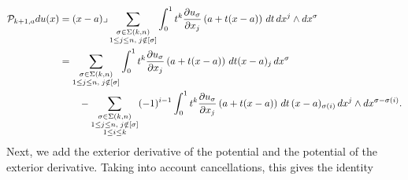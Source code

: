 \documentclass[10pt,a4paper]{article}
\begin{document}
\begin{align*}
    {\mathcal P}_{k+1,a} d u(x)
    &=
    (x-a)\lrcorner 
    \sum_{\substack{ \sigma \in \Sigma(k,n) \\ 1 \leq j \leq n, \; j \notin [\sigma] }}
    \int_{0}^{1} t^{k} \frac{ \partial u_{\sigma} }{\partial x_{j}}\left(a+t(x-a)\right) \,dt 
    \,dx^{j} \wedge dx^{\sigma}
    \\&
    = 
    \sum_{\substack{ \sigma \in \Sigma(k,n) \\ 1 \leq j \leq n, \; j \notin [\sigma] }} 
    \int_{0}^{1} t^{k} \frac{ \partial u_{\sigma} }{\partial x_{j}}\left(a+t(x-a)\right) \,dt (x-a)_{j}
    \,dx^{\sigma} 
    \\&\qquad 
    - 
    \sum_{\substack{ \sigma \in \Sigma(k,n) \\ 1 \leq j \leq n, \; j \notin [\sigma] \\ 1 \leq i \leq k }}
    (-1)^{i-1}
    \int_{0}^{1} t^{k} \frac{ \partial u_{\sigma} }{\partial x_{j}}\left(a+t(x-a)\right) \,dt 
    \,(x-a)_{\sigma(i)} 
    \,dx^{j} \wedge dx^{\sigma-\sigma(i)}
    .
\end{align*}
Next, we add the exterior derivative of the potential and the potential of the exterior derivative.
Taking into account cancellations, this gives the identity 
\begingroup\allowdisplaybreaks
\end{document}
